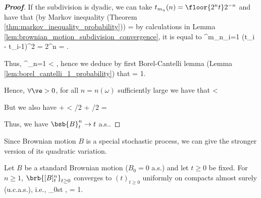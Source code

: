 \begin{proof}[\bf Proof]
If the subdivision is dyadic, we can take $t_{m_n}(n) = \floor{2^nt}2^{-n}$ and have that (by Markov inequality (Theorem \ref{thm:markov_inequality_probability}))
\be
\pro{} = \pro{} \leq {} \E{}\nonumber
\ee
by calculations in Lemma \ref{lem:brownian_motion_subdivision_convergence}, it is equal to
\be
{} \sum^{m_n}_{i=1} (t_i - t_{i-1})^2 =    2^n =  \leq {}.
\ee

Thus,
\be
\sum^\infty_{n=1} \pro{} < \infty,
\ee
hence we deduce by first Borel-Cantelli lemma (Lemma \ref{lem:borel_cantelli_1_probability}) that
\be
\pro{} = 1.
\ee

Hence, $\forall \ve >0$, for all $n = n(\omega)$ sufficiently large we have that
\be
{} < \ve {}
\ee

But we also have
\be
{} \leq {} +  < \ve/2 + \ve/2 = \ve\quad {}
\ee

Thus, we have $\bsb{B}^n_t \to t$ a.s..
\end{proof}

Since Brownian motion $B$ is a special stochastic process, we can give the stronger version of its quadratic variation.

\begin{theorem}\label{thm:brownian_motion_quadratic_variation_ucas}
Let $B$ be a standard Brownian motion ($B_0 = 0$ a.s.) and let $t \geq 0$ be fixed. For $n \geq 1$, $\brb{[B]^n_t}_{t\geq 0}$ converges to $(t)_{t\geq 0}$ uniformly on compacts almost surely (u.c.a.s.), i.e.,
\be
\sup_{0\leq s\leq t}  \quad {},\qquad {}\qquad \pro{} = 1.
\ee
\end{theorem}

